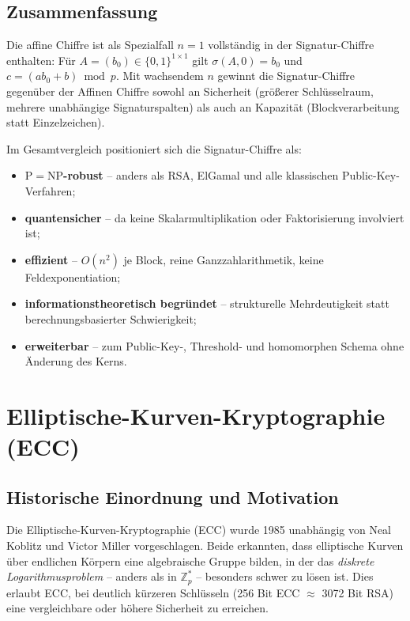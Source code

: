 ﻿\documentclass[a4paper,12pt]{scrreprt}
\theoremstyle{definition}
\begin{document}
\subsection{Zusammenfassung}

Die affine Chiffre \cite{Epp26c} ist als Spezialfall $n=1$ vollständig in der Signatur-Chiffre enthalten: Für $A=(b_0)\in\{0,1\}^{1\times1}$ gilt $\sigma(A,0)=b_0$ und $c=(ab_0+b)\bmod p$. Mit wachsendem $n$ gewinnt die Signatur-Chiffre gegenüber der Affinen Chiffre sowohl an Sicherheit (größerer Schlüsselraum, mehrere unabhängige Signaturspalten) als auch an Kapazität (Blockverarbeitung statt Einzelzeichen).

Im Gesamtvergleich positioniert sich die Signatur-Chiffre als:
\begin{itemize}
  \item \textbf{$\mathrm{P}=\mathrm{NP}$-robust} -- anders als RSA, ElGamal und alle klassischen Public-Key-Verfahren;
  \item \textbf{quantensicher} -- da keine Skalarmultiplikation oder Faktorisierung involviert ist;
  \item \textbf{effizient} -- $O(n^2)$ je Block, reine Ganzzahlarithmetik, keine Feldexponentiation;
  \item \textbf{informationstheoretisch begründet} -- strukturelle Mehrdeutigkeit statt berechnungsbasierter Schwierigkeit;
  \item \textbf{erweiterbar} -- zum Public-Key-, Threshold- und homomorphen Schema ohne Änderung des Kerns.
\end{itemize}

\section{Elliptische-Kurven-Kryptographie (ECC)}

\subsection{Historische Einordnung und Motivation}

Die Elliptische-Kurven-Kryptographie (ECC) wurde 1985 unabhängig von Neal Koblitz \cite{Kob87} und Victor Miller \cite{Mil86} vorgeschlagen. Beide erkannten, dass elliptische Kurven über endlichen Körpern eine algebraische Gruppe bilden, in der das \emph{diskrete Logarithmusproblem} -- anders als in $\mathbb{Z}_p^*$ -- besonders schwer zu lösen ist. Dies erlaubt ECC, bei deutlich kürzeren Schlüsseln (256 Bit ECC $\approx$ 3072 Bit RSA) eine vergleichbare oder höhere Sicherheit zu erreichen.
\end{document}
